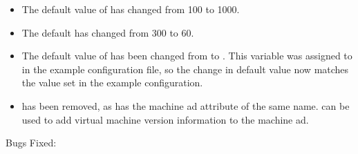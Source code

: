 \begin{itemize}
\item The default value of
   has
  changed from 100 to 1000.

\item The default  has changed from 300 to 60.

\item The default value of  has been
  changed from  to .  This variable
  was assigned to  in the example configuration file, so
  the change in default value now matches the value set in the example
  configuration.

\item {} has been removed, as has the machine ad
attribute of the same name.  can be used to
add virtual machine version information to the machine ad.

\end{itemize}

\noindent Bugs Fixed:

